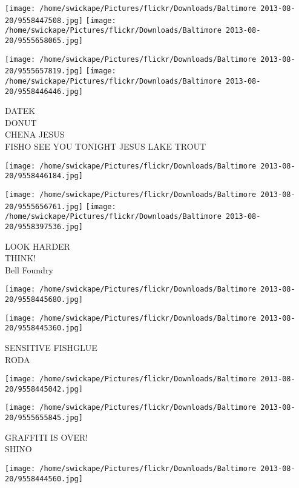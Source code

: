 \documentclass[10pt,letterpaper]{article}
\begin{document}
\texttt{[image: /home/swickape/Pictures/flickr/Downloads/Baltimore 2013-08-20/9558447508.jpg]}
\texttt{[image: /home/swickape/Pictures/flickr/Downloads/Baltimore 2013-08-20/9555658065.jpg]}

\texttt{[image: /home/swickape/Pictures/flickr/Downloads/Baltimore 2013-08-20/9555657819.jpg]}
\texttt{[image: /home/swickape/Pictures/flickr/Downloads/Baltimore 2013-08-20/9558446446.jpg]}

DATEK\\
DONUT\\
CHENA JESUS\\
FISHO SEE YOU TONIGHT JESUS LAKE TROUT\\
\pagebreak

\texttt{[image: /home/swickape/Pictures/flickr/Downloads/Baltimore 2013-08-20/9558446184.jpg]}

\vspace{0.25in}
\texttt{[image: /home/swickape/Pictures/flickr/Downloads/Baltimore 2013-08-20/9555656761.jpg]}
\texttt{[image: /home/swickape/Pictures/flickr/Downloads/Baltimore 2013-08-20/9558397536.jpg]}

LOOK HARDER\\
THINK!\\
Bell Foundry\\
\pagebreak

\texttt{[image: /home/swickape/Pictures/flickr/Downloads/Baltimore 2013-08-20/9558445680.jpg]}

\vspace{0.25in}
\texttt{[image: /home/swickape/Pictures/flickr/Downloads/Baltimore 2013-08-20/9558445360.jpg]}

SENSITIVE FISHGLUE\\
RODA\\
\pagebreak

\texttt{[image: /home/swickape/Pictures/flickr/Downloads/Baltimore 2013-08-20/9558445042.jpg]}

\vspace{0.25in}
\texttt{[image: /home/swickape/Pictures/flickr/Downloads/Baltimore 2013-08-20/9555655845.jpg]}

GRAFFITI IS OVER!\\
SHINO\\
\pagebreak

\texttt{[image: /home/swickape/Pictures/flickr/Downloads/Baltimore 2013-08-20/9558444560.jpg]}
\end{document}
